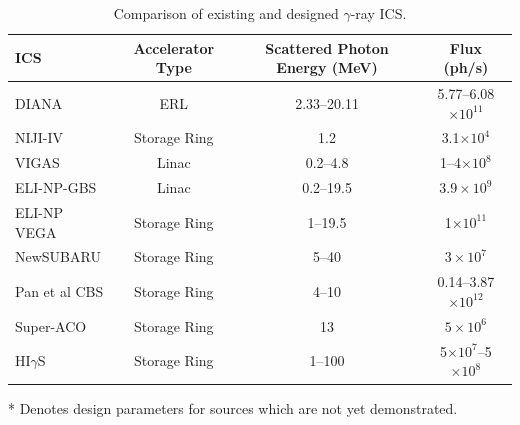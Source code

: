 \documentclass[../main.tex]{subfiles}
\begin{document}
\begin{table}[!h]
\caption{Comparison of existing and designed $\gamma$-ray ICS.}
\begin{threeparttable}
\begin{tabular}{lccc}
\hline\hline
ICS & Accelerator Type & Scattered Photon Energy (\si{\mega\electronvolt}) & Flux (ph/\si{\second}) \\
\hline
DIANA\tnote{*} & ERL & 2.33--20.11 & 5.77--6.08$\times 10^{11}$ \\ 
NIJI-IV \cite{sei2017demonstration} & Storage Ring & 1.2 & 3.1$\times 10^{4}$ \\
VIGAS\tnote{*} \cite{shi2021vigas,brenner2020summary} & Linac & 0.2--4.8 & 1--4$\times 10^{8}$ \\
ELI-NP-GBS\tnote{*} \cite{adriani2014technical} & Linac & 0.2--19.5 & $3.9\times 10^{9}$ \\
ELI-NP VEGA\tnote{*} \cite{tanaka2020current,elinp2019vega} & Storage Ring & 1--19.5 & 1$\times 10^{11}$\\
NewSUBARU \cite{utsunomiya2015gamma} & Storage Ring & 5--40 & $3\times 10^{7}$ \\
Pan et al CBS\tnote{*} \cite{pan2019design} & Storage Ring & 4--10 & 0.14--3.87$\times 10^{12}$ \\ 
Super-ACO \cite{nutarelli1998gamma} & Storage Ring & 13 & $5\times10^{6}$ \\
HI$\gamma$S \cite{weller2009research} & Storage Ring & 1--100 & 5$\times 10^{7}$--5$\times 10^{8}$ \\
\hline\hline
\end{tabular}
\begin{tablenotes}
\item[*]{Denotes design parameters for sources which are not yet demonstrated.}
\end{tablenotes}
\end{threeparttable}
\label{tab:gammaray_ICS_comparison}
\end{table}
\end{document}
